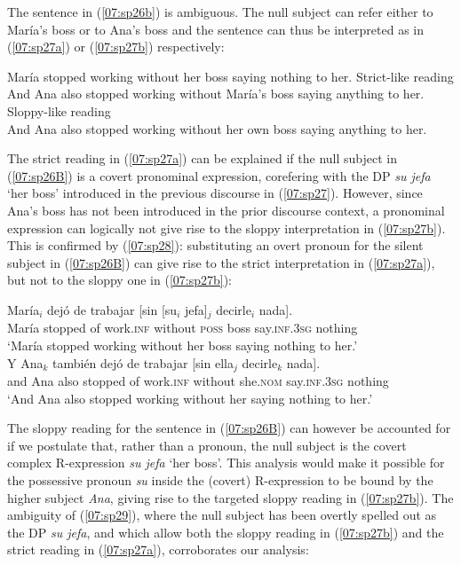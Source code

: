\documentclass[output=paper,colorlinks,citecolor=brown,draft,draftmode]{langscibook}
\begin{document}
The sentence in (\ref{07:sp26b}) is ambiguous. The null subject can refer either to María's boss or to Ana's boss and the sentence can thus be interpreted as in (\ref{07:sp27a}) or (\ref{07:sp27b}) respectively:

\ea\label{07:sp27}
María stopped working without her boss saying nothing to her.
\ea\label{07:sp27a}\cmark Strict-like reading\\
And Ana also stopped working without María's boss saying anything to her.\\
\ex\label{07:sp27b} \cmark Sloppy-like reading\\
 And Ana also stopped working without her own boss saying anything to her.
\z
 \z

The strict reading in (\ref{07:sp27a}) can be explained if the null subject in (\ref{07:sp26B}) is a covert pronominal expression, corefering with the DP \textit{su jefa} ‘her boss’ introduced in the previous discourse in (\ref{07:sp27}). However, since Ana's boss has not been introduced in the prior discourse context, a pronominal expression can logically not give rise to the sloppy interpretation in (\ref{07:sp27b}). This is confirmed by (\ref{07:sp28}): substituting an overt pronoun for the silent subject in (\ref{07:sp26B}) can give rise to the strict interpretation in (\ref{07:sp27a}), but not to the sloppy one in (\ref{07:sp27b}):

\begin{exe}
\ex\label{07:sp28}
\begin{xlista}
\ex
\gll\label{07:sp28A}María$_i$ dejó de trabajar [sin [su$_i$ jefa]$_j$ decirle$_i$ nada].\\
María stopped of work.\textsc{inf} without \textsc{poss} boss say.\textsc{inf}.\textsc{3sg} nothing\\
\glt ‘María stopped working without her boss saying nothing to her.’\\
\ex
\gll\label{07:sp28B}Y Ana$_k$ también dejó de trabajar [sin ella$_j$ decirle$_k$ nada].\\
and Ana also stopped of work.\textsc{inf} without she.\textsc{nom} say.\textsc{inf}.\textsc{3sg} nothing\\
\glt ‘And Ana also stopped working without her saying nothing to her.’
\end{xlista}
\end{exe}


The sloppy reading for the sentence in (\ref{07:sp26B}) can however be accounted for if we postulate that, rather than a pronoun, the null subject is the covert complex R-expression \textit{su jefa} ‘her boss’. This analysis would make it possible for the possessive pronoun \textit{su} inside the (covert) R-expression to be bound by the higher subject \textit{Ana}, giving rise to the targeted sloppy reading in (\ref{07:sp27b}). The ambiguity of (\ref{07:sp29}), where the null subject has been overtly spelled out as the DP \textit{su jefa}, and which allow both the sloppy reading in (\ref{07:sp27b}) and the strict reading in (\ref{07:sp27a}), corroborates our analysis:
\end{document}
